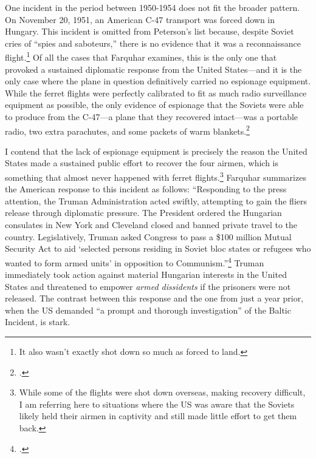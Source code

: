 \documentclass[14pt]{extarticle}
\begin{document}
One incident in the period between 1950-1954 does not fit the broader pattern. On November 20, 1951, an American C-47 transport was forced down in Hungary. This incident is omitted from Peterson's list because, despite Soviet cries of \enquote{spies and saboteurs,} there is no evidence that it was a reconnaissance flight.\footnote{It also wasn't exactly shot down so much as forced to land.} Of all the cases that Farquhar examines, this is the only one that provoked a sustained diplomatic response from the United States---and it is the only case where the plane in question definitively carried no espionage equipment. While the ferret flights were perfectly calibrated to fit as much radio surveillance equipment as possible, the only evidence of espionage that the Soviets were able to produce from the C-47---a plane that they recovered intact---was a portable radio, two extra parachutes, and some packets of warm blankets.\footcite{the_united_press_soviet_1951}

I contend that the lack of espionage equipment is precisely the reason the United States made a sustained public effort to recover the four airmen, which is something that almost never happened with ferret flights.\footnote{While some of the flights were shot down overseas, making recovery difficult, I am referring here to situations where the US was aware that the Soviets likely held their airmen in captivity and still made little effort to get them back.} Farquhar summarizes the American response to this incident as follows: ``Responding to the press attention, the Truman Administration acted swiftly, attempting to gain the fliers release through diplomatic pressure. The President ordered the Hungarian consulates in New York and Cleveland closed and banned private travel to the country. Legislatively, Truman asked Congress to pass a \$100 million Mutual Security Act to aid `selected persons residing in Soviet bloc states or refugees who wanted to form armed units' in opposition to Communism.''\footcite[p.~43]{farquhar_aerial_2015} Truman immediately took action against material Hungarian interests in the United States and threatened to empower \emph{armed dissidents} if the prisoners were not released. The contrast between this response and the one from just a year prior, when the US demanded \enquote{a prompt and thorough investigation} of the Baltic Incident, is stark.
\end{document}
